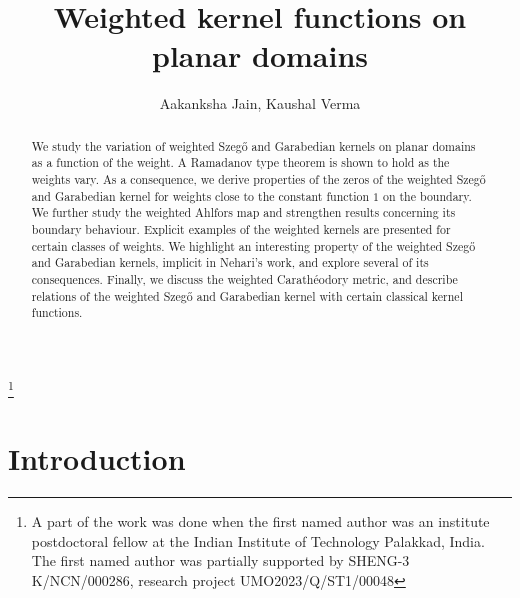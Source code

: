 \documentclass[11pt, reqno]{amsart}
\numberwithin{equation}{section}
\begin{document}
	\title[Weighted kernel functions on planar domains]{Weighted kernel functions on planar domains}
	\thanks{A part of the work was done when the first named author was an institute postdoctoral fellow at the Indian Institute of Technology Palakkad, India. The first named author was partially supported by SHENG-3 K/NCN/000286, research project UMO2023/Q/ST1/00048}
	\author{Aakanksha Jain, Kaushal Verma} 
	\address{AJ: Department of Mathematics, Indian Institute of Technology, Kanjikode, Pudussery west, Palakkad, Kerala 678623, India}
    \address{Current address: Institute of Mathematics, Jagiellonian University, ul Lojasiewicza 6, 30-348 Kraków, Poland}
    
	
	\address{KV: Department of Mathematics, Indian Institute of Science, Bengaluru-560012, India}
	
\begin{abstract}
We study the variation of weighted Szeg\H{o} and Garabedian kernels on planar domains as a function of the weight. A Ramadanov type theorem is shown to hold as the weights vary. As a consequence, we derive properties of the zeros of the weighted Szeg\H{o} and Garabedian kernel for weights close to the constant function $1$ on the boundary. We further study the weighted Ahlfors map and strengthen results concerning its boundary behaviour. Explicit examples of the weighted kernels are presented for certain classes of weights. We highlight an interesting property of the weighted Szeg\H{o} and Garabedian kernels, implicit in Nehari’s work, and explore several of its consequences. Finally, we discuss the weighted Carathéodory metric, and describe relations of the weighted Szeg\H{o} and Garabedian kernel with certain classical kernel functions.
\end{abstract}
	
\maketitle

\section{Introduction}
\end{document}
